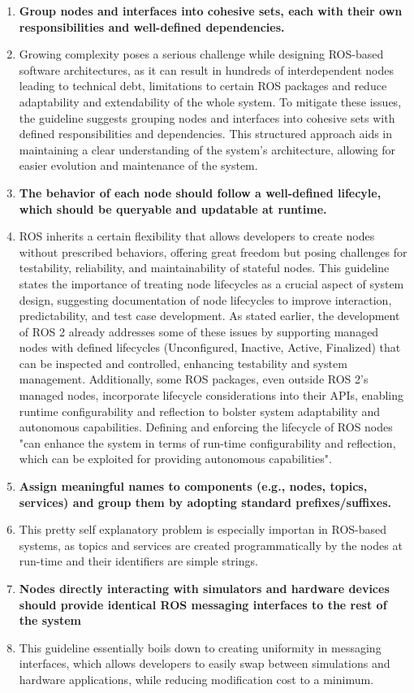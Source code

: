 \documentclass[%
paper=A4,               %
twoside=true,           %
openright,              %
11pt,                   %
bibliography=totoc,     %
titlepage=on,           %
DIV=12,                 %
BCOR=1.5cm,             %
parskip=half,            %
final
]{scrreprt}
\begin{document}
\begin{enumerate}[leftmargin=9mm, align=left]
		\item \textbf{Group nodes and interfaces into cohesive sets, each with their own responsibilities and well-defined dependencies.} 
		\item[]Growing complexity poses a serious challenge while designing ROS-based software architectures, as it can result in hundreds of interdependent nodes leading to technical debt, limitations to certain ROS packages and reduce adaptability and extendability of the whole system. To mitigate these issues, the guideline suggests grouping nodes and interfaces into cohesive sets with defined responsibilities and dependencies. This structured approach aids in maintaining a clear understanding of the system's architecture, allowing for easier evolution and maintenance of the system. \autocite{malavoltaHowYouArchitect2020}
		\item \textbf{The behavior of each node should follow a well-defined lifecyle, which should be queryable and updatable at runtime.} 
		\item[]ROS inherits a certain flexibility that allows developers to create nodes without prescribed behaviors, offering great freedom but posing challenges for testability, reliability, and maintainability of stateful nodes. This guideline states the importance of treating node lifecycles as a crucial aspect of system design, suggesting documentation of node lifecycles to improve interaction, predictability, and test case development. As stated earlier, the development of ROS 2 already addresses some of these issues by supporting managed nodes with defined lifecycles (Unconfigured, Inactive, Active, Finalized) that can be inspected and controlled, enhancing testability and system management. Additionally, some ROS packages, even outside ROS 2's managed nodes, incorporate lifecycle considerations into their APIs, enabling runtime configurability and reflection to bolster system adaptability and autonomous capabilities. \autocite{malavoltaHowYouArchitect2020}  Defining and enforcing the lifecycle of ROS nodes "can enhance the system in terms of run-time configurability and reflection, which can be exploited for providing autonomous capabilities". \autocite{malavoltaHowYouArchitect2020}
		\item  \textbf{Assign meaningful names to components (e.g., nodes, topics, services) and group them by adopting standard prefixes/suffixes.} 
		\item[] This pretty self explanatory problem is especially importan in ROS-based systems, as topics and services are created programmatically by the nodes at run-time and their identifiers are simple strings. \autocite{malavoltaHowYouArchitect2020}
		\item  \textbf{Nodes directly interacting with simulators and hardware devices should provide identical ROS messaging interfaces to the rest of the system} 
		\item[] This guideline essentially boils down to creating uniformity in messaging interfaces, which allows developers to easily swap between simulations and hardware applications, while reducing modification cost to a minimum. \autocite{malavoltaHowYouArchitect2020}
		

\end{enumerate}
\end{document}
